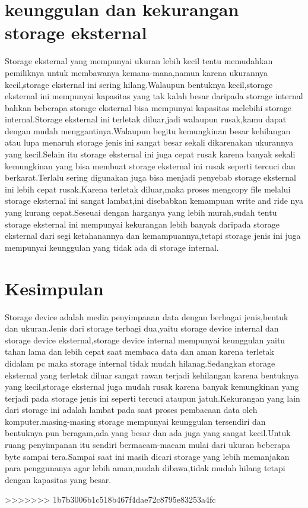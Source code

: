 \section{keunggulan dan kekurangan storage eksternal}

Storage eksternal yang mempunyai ukuran lebih kecil tentu memudahkan pemiliknya untuk membawanya kemana-mana,namun karena ukurannya kecil,storage eksternal ini sering hilang.Walaupun bentuknya kecil,storage eksternal ini mempunyai kapasitas yang tak kalah besar daripada storage internal bahkan beberapa storage eksternal bisa mempunyai kapasitas melebihi storage internal.Storage eksternal ini terletak diluar,jadi walaupun rusak,kamu dapat dengan mudah menggantinya.Walaupun begitu kemungkinan besar kehilangan atau lupa menaruh storage jenis ini sangat besar sekali dikarenakan ukurannya yang kecil.Selain itu storage eksternal ini juga cepat rusak karena banyak sekali kemungkinan yang bisa membuat storage eksternal ini rusak seperti tercuci dan berkarat.Terlalu sering digunakan juga bisa menjadi penyebab storage eksternal ini lebih cepat rusak.Karena terletak diluar,maka proses mengcopy file melalui storage eksternal ini sangat lambat,ini disebabkan kemampuan write and ride nya yang kurang cepat.Seseuai dengan harganya yang lebih murah,sudah tentu storage eksternal ini mempunyai kekurangan lebih banyak daripada storage eksternal dari segi ketahanannya dan kemampuannya,tetapi storage jenis ini juga mempunyai keunggulan yang tidak ada di storage internal.

\section{Kesimpulan}

Storage device adalah media penyimpanan data dengan berbagai jenis,bentuk dan ukuran.Jenis dari storage terbagi dua,yaitu storage device internal dan storage device eksternal,storage device internal mempunyai keunggulan yaitu tahan lama dan lebih cepat saat membaca data dan aman karena terletak didalam pc maka storage internal tidak mudah hilanag.Sedangkan storage eksternal yang terletak diluar sangat rawan terjadi kehilangan karena bentuknya yang kecil,storage eksternal juga mudah rusak karena banyak kemungkinan yang terjadi pada storage jenis ini seperti tercuci ataupun jatuh.Kekurangan yang lain dari storage ini adalah lambat pada saat proses pembacaan data oleh komputer.masing-masing storage mempunyai keunggulan tersendiri dan bentuknya pun beragam,ada yang besar dan ada juga yang sangat kecil.Untuk ruang penyimpanan itu sendiri bermacam-macam mulai dari ukuran beberapa byte sampai tera.Sampai saat ini masih dicari storage yang lebih memanjakan para penggunanya agar lebih aman,mudah dibawa,tidak mudah hilang tetapi dengan kapasitas yang besar.



>>>>>>> 1b7b3006b1c518b467f4dae72c8795e83253a4fc
